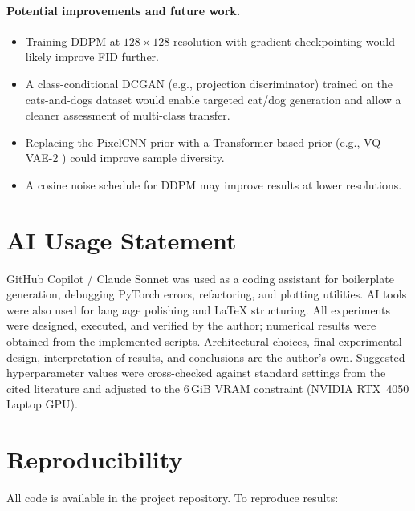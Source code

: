 \documentclass[12pt,a4paper]{article}
\begin{document}
\paragraph{Potential improvements and future work.}
\begin{itemize}[noitemsep]
  \item Training DDPM at $128\times128$ resolution with gradient checkpointing
        would likely improve FID further.
  \item A class-conditional DCGAN (e.g., projection discriminator) trained on
        the cats-and-dogs dataset would enable targeted cat/dog generation and
        allow a cleaner assessment of multi-class transfer.
  \item Replacing the PixelCNN prior with a Transformer-based prior (e.g.,
        VQ-VAE-2 \cite{vqvae2}) could improve sample diversity.
  \item A cosine noise schedule for DDPM may improve results at lower resolutions.
\end{itemize}

\section*{AI Usage Statement}
\label{sec:ai}

GitHub Copilot / Claude Sonnet was used as a coding assistant for boilerplate
generation, debugging PyTorch errors, refactoring, and plotting utilities.
AI tools were also used for language polishing and \LaTeX{} structuring.
All experiments were designed, executed, and verified by the author; numerical
results were obtained from the implemented scripts.  Architectural choices,
final experimental design, interpretation of results, and conclusions are the
author's own.  Suggested hyperparameter values were cross-checked against
standard settings from the cited literature and adjusted to the
6\,GiB VRAM constraint (NVIDIA RTX~4050 Laptop GPU).

\section*{Reproducibility}

All code is available in the project repository.  To reproduce results:
\end{document}
